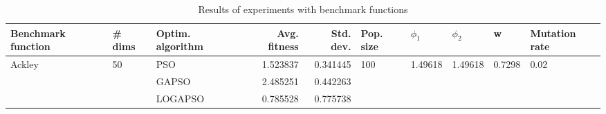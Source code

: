\begin{table}
\centering
\caption{Results of experiments with benchmark functions}
\begin{tabular}{lllrrlllll}
\toprule
     Benchmark function &             \# dims & Optim. algorithm &  Avg. fitness &  Std. dev. &            Pop. size &               $\phi_{1}$ &               $\phi_{2}$ &                       w &         Mutation rate \\
\midrule
\multirow{3}{*}{Ackley} & \multirow{3}{*}{50} &              PSO &      1.523837 &   0.341445 & \multirow{3}{*}{100} & \multirow{3}{*}{1.49618} & \multirow{3}{*}{1.49618} & \multirow{3}{*}{0.7298} & \multirow{3}{*}{0.02} \\
                        &                     &            GAPSO &      2.485251 &   0.442263 &                      &                          &                          &                         &                       \\
                        &                     &          LOGAPSO &      0.785528 &   0.775738 &                      &                          &                          &                         &                       \\
\bottomrule
\end{tabular}
\end{table}

